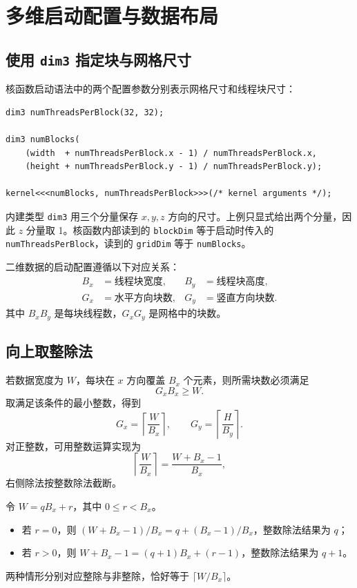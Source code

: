 \section{多维启动配置与数据布局}

\subsection{使用 \texttt{dim3} 指定块与网格尺寸}

核函数启动语法中的两个配置参数分别表示网格尺寸和线程块尺寸：
\par\noindent\begin{minipage}{\linewidth}
\begin{lstlisting}[caption={二维网格的典型启动配置}]
dim3 numThreadsPerBlock(32, 32);

dim3 numBlocks(
    (width  + numThreadsPerBlock.x - 1) / numThreadsPerBlock.x,
    (height + numThreadsPerBlock.y - 1) / numThreadsPerBlock.y);

kernel<<<numBlocks, numThreadsPerBlock>>>(/* kernel arguments */);
\end{lstlisting}
\end{minipage}\par

内建类型 \texttt{dim3} 用三个分量保存 $x,y,z$ 方向的尺寸。上例只显式给出两个分量，因此 $z$ 分量取 1。核函数内部读到的 \texttt{blockDim} 等于启动时传入的 \texttt{numThreadsPerBlock}，读到的 \texttt{gridDim} 等于 \texttt{numBlocks}。

二维数据的启动配置遵循以下对应关系：
\[
\begin{aligned}
B_x &= \text{线程块宽度}, & B_y &= \text{线程块高度},\\
G_x &= \text{水平方向块数}, & G_y &= \text{竖直方向块数}.
\end{aligned}
\]
其中 $B_xB_y$ 是每块线程数，$G_xG_y$ 是网格中的块数。

\subsection{向上取整除法}

若数据宽度为 $W$，每块在 $x$ 方向覆盖 $B_x$ 个元素，则所需块数必须满足
\[
G_xB_x\geq W.
\]
取满足该条件的最小整数，得到
\[
\boxed{G_x=\left\lceil\frac{W}{B_x}\right\rceil},\qquad
\boxed{G_y=\left\lceil\frac{H}{B_y}\right\rceil}.
\]
对正整数，可用整数运算实现为
\[
\left\lceil\frac{W}{B_x}\right\rceil
=\frac{W+B_x-1}{B_x},
\]
右侧除法按整数除法截断。

\begin{derivationbox}[title=整数向上取整公式为何成立]
令 $W=qB_x+r$，其中 $0\leq r<B_x$。
\begin{itemize}
  \item 若 $r=0$，则 $(W+B_x-1)/B_x=q+(B_x-1)/B_x$，整数除法结果为 $q$；
  \item 若 $r>0$，则 $W+B_x-1=(q+1)B_x+(r-1)$，整数除法结果为 $q+1$。
\end{itemize}
两种情形分别对应整除与非整除，恰好等于 $\lceil W/B_x\rceil$。
\end{derivationbox}

